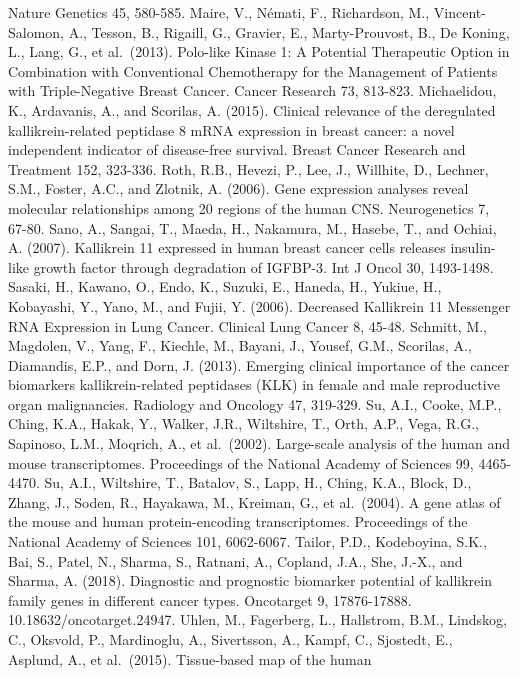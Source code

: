 \documentclass[
]{article}
\begin{document}
Nature Genetics 45, 580-585. Maire, V., Némati, F., Richardson, M.,
Vincent-Salomon, A., Tesson, B., Rigaill, G., Gravier, E.,
Marty-Prouvost, B., De Koning, L., Lang, G., et al.~(2013). Polo-like
Kinase 1: A Potential Therapeutic Option in Combination with
Conventional Chemotherapy for the Management of Patients with
Triple-Negative Breast Cancer. Cancer Research 73, 813-823. Michaelidou,
K., Ardavanis, A., and Scorilas, A. (2015). Clinical relevance of the
deregulated kallikrein-related peptidase 8 mRNA expression in breast
cancer: a novel independent indicator of disease-free survival. Breast
Cancer Research and Treatment 152, 323-336. Roth, R.B., Hevezi, P., Lee,
J., Willhite, D., Lechner, S.M., Foster, A.C., and Zlotnik, A. (2006).
Gene expression analyses reveal molecular relationships among 20 regions
of the human CNS. Neurogenetics 7, 67-80. Sano, A., Sangai, T., Maeda,
H., Nakamura, M., Hasebe, T., and Ochiai, A. (2007). Kallikrein 11
expressed in human breast cancer cells releases insulin-like growth
factor through degradation of IGFBP-3. Int J Oncol 30, 1493-1498.
Sasaki, H., Kawano, O., Endo, K., Suzuki, E., Haneda, H., Yukiue, H.,
Kobayashi, Y., Yano, M., and Fujii, Y. (2006). Decreased Kallikrein 11
Messenger RNA Expression in Lung Cancer. Clinical Lung Cancer 8, 45-48.
Schmitt, M., Magdolen, V., Yang, F., Kiechle, M., Bayani, J., Yousef,
G.M., Scorilas, A., Diamandis, E.P., and Dorn, J. (2013). Emerging
clinical importance of the cancer biomarkers kallikrein-related
peptidases (KLK) in female and male reproductive organ malignancies.
Radiology and Oncology 47, 319-329. Su, A.I., Cooke, M.P., Ching, K.A.,
Hakak, Y., Walker, J.R., Wiltshire, T., Orth, A.P., Vega, R.G.,
Sapinoso, L.M., Moqrich, A., et al.~(2002). Large-scale analysis of the
human and mouse transcriptomes. Proceedings of the National Academy of
Sciences 99, 4465-4470. Su, A.I., Wiltshire, T., Batalov, S., Lapp, H.,
Ching, K.A., Block, D., Zhang, J., Soden, R., Hayakawa, M., Kreiman, G.,
et al.~(2004). A gene atlas of the mouse and human protein-encoding
transcriptomes. Proceedings of the National Academy of Sciences 101,
6062-6067. Tailor, P.D., Kodeboyina, S.K., Bai, S., Patel, N., Sharma,
S., Ratnani, A., Copland, J.A., She, J.-X., and Sharma, A. (2018).
Diagnostic and prognostic biomarker potential of kallikrein family genes
in different cancer types. Oncotarget 9, 17876-17888.
10.18632/oncotarget.24947. Uhlen, M., Fagerberg, L., Hallstrom, B.M.,
Lindskog, C., Oksvold, P., Mardinoglu, A., Sivertsson, A., Kampf, C.,
Sjostedt, E., Asplund, A., et al.~(2015). Tissue-based map of the human
\end{document}
